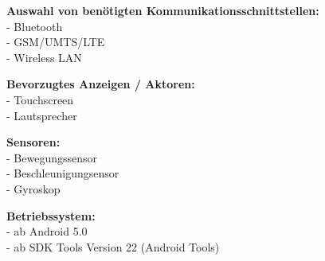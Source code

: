 \textbf{Auswahl von benötigten Kommunikationsschnittstellen:}\\
- Bluetooth\\
- GSM/UMTS/LTE\\
- Wireless LAN

\textbf{Bevorzugtes Anzeigen / Aktoren:}\\
- Touchscreen\\
- Lautsprecher

\textbf{Sensoren:}\\
- Bewegungssensor\\
- Beschleunigungsensor\\
- Gyroskop

\textbf{Betriebssystem:}\\
- ab Android 5.0\\
- ab SDK Tools Version 22 (Android Tools)

\newpage

